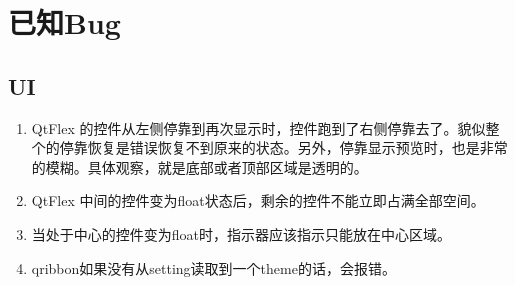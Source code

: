 \section{已知Bug}

\subsection{UI}

\begin{enumerate}
	\item QtFlex 的控件从左侧停靠到再次显示时，控件跑到了右侧停靠去了。貌似整个的停靠恢复是错误恢复不到原来的状态。另外，停靠显示预览时，也是非常的模糊。具体观察，就是底部或者顶部区域是透明的。
	\item QtFlex 中间的控件变为float状态后，剩余的控件不能立即占满全部空间。
	\item 当处于中心的控件变为float时，指示器应该指示只能放在中心区域。
	
	\item qribbon如果没有从setting读取到一个theme的话，会报错。
\end{enumerate}